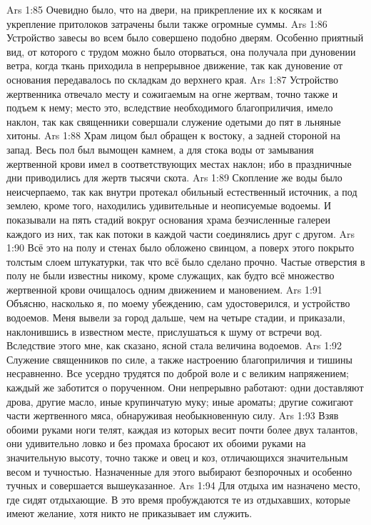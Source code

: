 \vs Ars 1:85
Очевидно было, что на двери, на прикрепление их к косякам и укрепление притолоков затрачены были также огромные суммы.
\vs Ars 1:86
Устройство завесы во всем было совершено подобно дверям. Особенно приятный вид, от которого с трудом можно было оторваться, она получала при дуновении ветра, когда ткань приходила в непрерывное движение, так как дуновение от основания передавалось по складкам до верхнего края.
\vs Ars 1:87
Устройство жертвенника отвечало месту и сожигаемым на огне жертвам, точно также и подъем к нему; место это, вследствие необходимого благоприличия, имело наклон, так как священники совершали служение одетыми до пят в льняные хитоны.
\vs Ars 1:88
Храм лицом был обращен к востоку, а задней стороной на запад. Весь пол был вымощен камнем, а для стока воды от замывания жертвенной крови имел в соответствующих местах наклон; ибо в праздничные дни приводились для жертв тысячи скота.
\vs Ars 1:89
Скопление же воды было неисчерпаемо, так как внутри протекал обильный естественный источник, а под землею, кроме того, находились удивительные и неописуемые водоемы. И показывали на пять стадий вокруг основания храма безчисленные галереи каждого из них, так как потоки в каждой части соединялись друг с другом.
\vs Ars 1:90
Всё это на полу и стенах было обложено свинцом, а поверх этого покрыто толстым слоем штукатурки, так что всё было сделано прочно. Частые отверстия в полу не были известны никому, кроме служащих, как будто всё множество жертвенной крови очищалось одним движением и мановением.
\vs Ars 1:91
Объясню, насколько я, по моему убеждению, сам удостоверился, и устройство водоемов. Меня вывели за город дальше, чем на четыре стадии, и приказали, наклонившись в известном месте, прислушаться к шуму от встречи вод. Вследствие этого мне, как сказано, ясной стала величина водоемов.
\vs Ars 1:92
Служение священников по силе, а также настроению благоприличия и тишины несравненно. Все усердно трудятся по доброй воле и с великим напряжением; каждый же заботится о порученном. Они непрерывно работают: одни доставляют дрова, другие масло, иные крупинчатую муку; иные ароматы; другие сожигают части жертвенного мяса, обнаруживая необыкновенную силу.
\vs Ars 1:93
Взяв обоими руками ноги телят, каждая из которых весит почти более двух талантов, они удивительно ловко и без промаха бросают их обоими руками на значительную высоту, точно также и овец и коз, отличающихся значительным весом и тучностью. Назначенные для этого выбирают безпорочных и особенно тучных и совершается вышеуказанное.
\vs Ars 1:94
Для отдыха им назначено место, где сидят отдыхающие. В это время пробуждаются те из отдыхавших, которые имеют желание, хотя никто не приказывает им служить.

